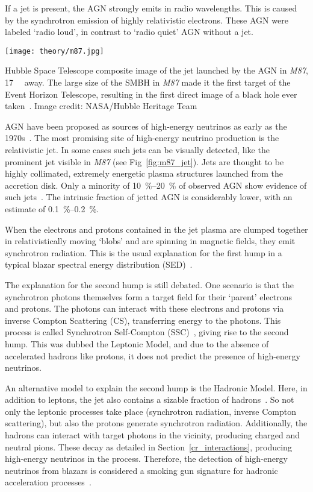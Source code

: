 If a jet is present, the AGN strongly emits in radio wavelengths. This is caused by the synchrotron emission of highly relativistic electrons. These AGN were labeled `radio loud', in contrast to `radio quiet' AGN without a jet.

\begin{marginfigure}
  \texttt{[image: theory/m87.jpg]}
  \caption[\textit{M87} jet]{Hubble Space Telescope composite image of the jet launched by the AGN in \textit{M87}, \SI{17}{\mega\parsec} away. The large size of the SMBH in \textit{M87} made it the first target of the Event Horizon Telescope, resulting in the first direct image of a black hole ever taken~\cite{Akiyama2019}. Image credit: NASA/Hubble Heritage Team}
\end{marginfigure}

AGN have been proposed as sources of high-energy neutrinos as early as the 1970s~. The most promising site of high-energy neutrino production is the relativistic jet. In some cases such jets can be visually detected, like the prominent jet visible in \textit{M87} (see Fig~\ref{fig:m87_jet}). Jets are thought to be highly collimated, extremely energetic plasma structures launched from the accretion disk. Only a minority of \SIrange{10}{20}{\percent} of observed AGN show evidence of such jets~. The intrinsic fraction of jetted AGN is considerably lower, with an estimate of \SIrange{0.1}{0.2}{\percent}.

When the electrons and protons contained in the jet plasma are clumped together in relativistically moving `blobs' and are spinning in magnetic fields, they emit synchrotron radiation. This is the usual explanation for the first hump in a typical blazar spectral energy distribution (SED)~.

The explanation for the second hump is still debated. One scenario is that the synchrotron photons themselves form a target field for their `parent' electrons and protons. The photons can interact with these electrons and protons via inverse Compton Scattering (CS), transferring energy to the photons. This process is called Synchrotron Self-Compton (SSC)~\cite{Spurio2018}, giving rise to the second hump. This was dubbed the Leptonic Model, and due to the absence of accelerated hadrons like protons, it does not predict the presence of high-energy neutrinos.

An alternative model to explain the second hump is the Hadronic Model. Here, in addition to leptons, the jet also contains a sizable fraction of hadrons~. So not only the leptonic processes take place (synchrotron radiation, inverse Compton scattering), but also the protons generate synchrotron radiation. Additionally, the hadrons can interact with target photons in the vicinity, producing charged and neutral pions. These decay as detailed in Section~\ref{cr_interactions}, producing high-energy neutrinos in the process. Therefore, the detection of high-energy neutrinos from blazars is considered a smoking gun signature for hadronic acceleration processes~.

